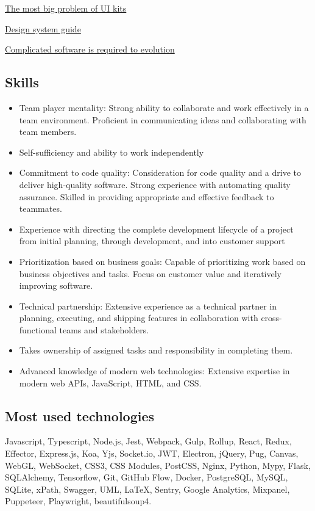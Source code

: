 \documentclass{vitonsky}
\begin{document}
\href{https://vitonsky.net/blog/2022/05/23/ui-kit-design/}{The most big problem of UI kits}

\href{https://vitonsky.net/blog/2023/03/18/design-system-guide/}{Design system guide}

\href{https://vitonsky.net/blog/2022/06/08/complicated-software/}{Complicated software is required to evolution}

\subsection*{Skills}

\begin{itemize}
\item
  Team player mentality: Strong ability to collaborate and work effectively in a team environment. Proficient in communicating ideas and collaborating with team members.
\item
  Self-sufficiency and ability to work independently
\item
  Commitment to code quality: Consideration for code quality and a drive to deliver high-quality software. Strong experience with automating quality assurance. Skilled in providing appropriate and effective feedback to teammates.
\item
  Experience with directing the complete development lifecycle of a project from initial planning, through development, and into customer support
\item
  Prioritization based on business goals: Capable of prioritizing work based on business objectives and tasks. Focus on customer value and iteratively improving software.
\item
  Technical partnership: Extensive experience as a technical partner in planning, executing, and shipping features in collaboration with cross-functional teams and stakeholders.
\item
  Takes ownership of assigned tasks and responsibility in completing them.
\item
  Advanced knowledge of modern web technologies: Extensive expertise in modern web APIs, JavaScript, HTML, and CSS.
\end{itemize}

\subsection*{Most used technologies}

Javascript, Typescript, Node.js, Jest, Webpack, Gulp, Rollup,
React, Redux, Effector, Express.js, Koa, Yjs, Socket.io, JWT, Electron, jQuery, Pug,
Canvas, WebGL, WebSocket, CSS3, CSS Modules, PostCSS,
Nginx, Python, Mypy, Flask, SQLAlchemy, Tensorflow, Git, GitHub Flow, Docker, PostgreSQL, MySQL, SQLite, xPath, Swagger, UML, LaTeX,
Sentry, Google Analytics, Mixpanel, Puppeteer, Playwright, beautifulsoup4.
\end{document}
